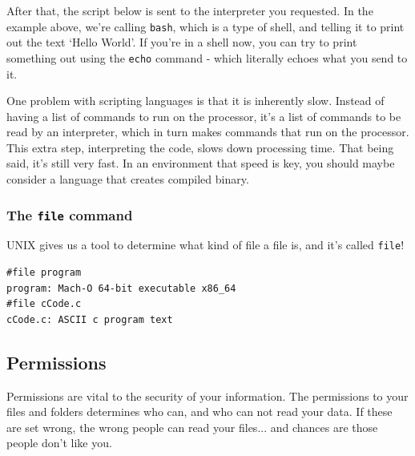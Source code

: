	After that, the script below is sent to the interpreter you requested. In the example above, we're calling
	{\tt bash}, which is a type of shell, and telling it to print out the text `Hello World'. If you're in
	a shell now, you can try to print something out using the {\tt echo} command - which literally echoes what you 
	send to it.
	
	One problem with scripting languages is that it is inherently slow. Instead of having a list 
	of commands to run on the processor, it's a list of commands to be read by an interpreter, which
	in turn makes commands that run on the processor. This extra step, interpreting the code, slows down processing time.
	That being said, it's still very fast. In an environment that speed is key, you should maybe consider a 
	language that creates compiled binary.
	
\subsubsection{The {\tt file} command}

	UNIX gives us a tool to determine what kind of file a file is, and it's called {\tt file}!

\begin{verbatim}	
#file program
program: Mach-O 64-bit executable x86_64
#file cCode.c
cCode.c: ASCII c program text
\end{verbatim}	


\subsection {Permissions}
	
	Permissions are vital to the security of your information. The permissions to your files and folders
	determines who can, and who can not read your data. If these are set wrong, the wrong people can read
	your files... and chances are those people don't like you.
	
